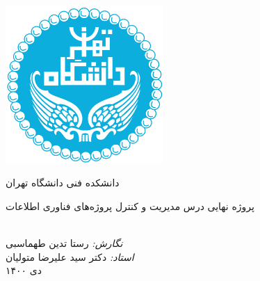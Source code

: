 \begin{titlepage}

	\begin{center}
		
		\includegraphics[width=6cm]{images/titlepage/Tehran.png}
		
		\Large{دانشکده فنی دانشگاه تهران}

		\vspace{2.5cm}
		\fontsize{18}{18} { پروژه‌ نهایی درس مدیریت و کنترل پروژه‌های فناوری اطلاعات }
		\\[1cm]
		
	
		\\[3cm]
		{\normalsize {
			\emph{ نگارش: }
		رستا تدین طهماسبی
		\\		
	
		
			\emph{استاد: }
			دکتر سید علیرضا متولیان
		}}
		\\[4cm]

	\large{دی ۱۴۰۰}
	\end{center}
	
\end{titlepage}